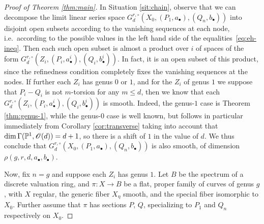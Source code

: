 \documentclass{amsart}
\begin{document}
\begin{proof}[Proof of Theorem \ref{thm:main}]
In Situation \ref{sit:chain}, observe that we can decompose the limit
linear series space
$G^{r,\circ}_d(X_0,(P_1,a_{\bullet}),(Q_n,b_{\bullet}))$ into disjoint open
subsets according to the vanishing sequences at each node, i.e.~according
to the possible values in the left hand side of the equalities~\eqref{eq:eh-ineq}.
Then each such open subset is almost a product over $i$ of spaces of the form
$G^{r,\circ}_d(Z_i,(P_i,a^i_{\bullet}),(Q_i,b^i_{\bullet}))$. In fact, it
is an open subset of this product, since the refinedness condition completely
fixes the vanishing sequences at the nodes. If further
each $Z_i$ has genus $0$ or $1$, and for the $Z_i$ of genus $1$ we
suppose that $P_i-Q_i$ is not $m$-torsion for any $m \leq d$, then we know 
that each $G^{r,\circ}_d(Z_i,(P_i,a^i_{\bullet}),(Q_i,b^i_{\bullet}))$ is
smooth. Indeed, the genus-$1$ case is Theorem \ref{thm:genus-1}, while the
genus-$0$ case is well known, but follows in particular immediately from
Corollary \ref{cor:transverse} taking into account that 
$\dim \Gamma({\mathbb P}^1,{\mathscr O}(d))=d+1$, so there is a shift of $1$ in the value
of $d$. We thus conclude that
$G^{r,\circ}_d(X_0,(P_1,a_{\bullet}),(Q_n,b_{\bullet}))$ is also smooth,
of dimension $\rho(g,r,d,a_{\bullet},b_{\bullet})$.

Now, fix $n=g$ and suppose each $Z_i$ has genus $1$.
Let $B$ be the spectrum of a discrete valuation ring, and $\pi:X \to B$ be
a flat, proper family of curves of genus $g$, with 
$X$ regular, the generic fiber $X_{\eta}$ smooth, and the special fiber
isomorphic to $X_0$. Further assume that $\pi$ has sections $P$, $Q$,
specializing to $P_1$ and $Q_n$ respectively on $X_0$.


\end{proof}
\end{document}
